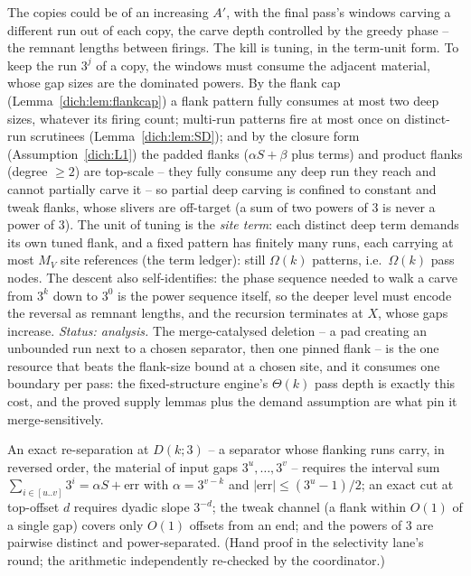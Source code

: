 \begin{proposition}
    \label{dich:escapeB}
    The copies could be of an increasing $A'$, with the final pass's
    windows carving a different run out of each copy, the carve depth
    controlled by the greedy phase -- the remnant lengths between
    firings.  The kill is tuning, in the term-unit form.  To keep the
    run $3^j$ of a copy, the windows must consume the adjacent
    material, whose gap sizes are the dominated powers.  By the flank
    cap (Lemma~\ref{dich:lem:flankcap}) a flank pattern fully consumes
    at most two deep sizes, whatever its firing count; multi-run
    patterns fire at most once on distinct-run scrutinees
    (Lemma~\ref{dich:lem:SD}); and by the closure form
    (Assumption~\ref{dich:L1}) the padded flanks ($\alpha S + \beta$
    plus terms) and product flanks (degree $\ge 2$) are top-scale --
    they fully consume any deep run they reach and cannot partially
    carve it -- so partial deep carving is confined to constant and
    tweak flanks, whose slivers are off-target (a sum of two powers
    of $3$ is never a power of $3$).  The unit of tuning is the
    \emph{site term}: each distinct deep term demands its own tuned
    flank, and a fixed pattern has finitely many runs, each carrying
    at most $M_V$ site references (the term ledger): still
    $\Omega(k)$ patterns, i.e.\ $\Omega(k)$ pass nodes.  The descent
    also self-identifies: the phase sequence needed to walk a carve
    from $3^k$ down to $3^0$ is the power sequence itself, so the
    deeper level must encode the reversal as remnant lengths, and the
    recursion terminates at $X$, whose gaps increase.
    \emph{Status: analysis.}  The merge-catalysed deletion -- a pad
    creating an unbounded run next to a chosen separator, then one
    pinned flank -- is the one resource that beats the flank-size
    bound at a chosen site, and it consumes one boundary per pass:
    the fixed-structure engine's $\Theta(k)$ pass depth is exactly
    this cost, and the proved supply lemmas plus the demand assumption
    are what pin it merge-sensitively.
\end{proposition}

\begin{lemma}
    \label{dich:lem:L2.1}
    An exact re-separation at $D(k;3)$ -- a separator whose flanking
    runs carry, in reversed order, the material of input gaps
    $3^u, \ldots, 3^v$ -- requires the interval sum
    $\sum_{i \in [u..v]} 3^i = \alpha S + \mathrm{err}$ with
    $\alpha = 3^{v-k}$ and $|\mathrm{err}| \le (3^u-1)/2$; an exact
    cut at top-offset $d$ requires dyadic slope $3^{-d}$; the tweak
    channel (a flank within $O(1)$ of a single gap) covers only
    $O(1)$ offsets from an end; and the powers of $3$ are pairwise
    distinct and power-separated.  (Hand proof in the selectivity
    lane's round; the arithmetic independently re-checked by the
    coordinator.)
\end{lemma}

